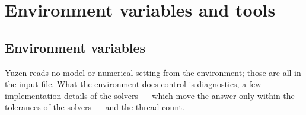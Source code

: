 \chapter{Environment variables and tools}
\label{ch:environment}

\section{Environment variables}
\label{sec:env:vars}

Yuzen reads no model or numerical setting from the environment; those are all
in the input file. What the environment does control is diagnostics, a few
implementation details of the solvers --- which move the answer only within
the tolerances of the solvers --- and the thread count.

